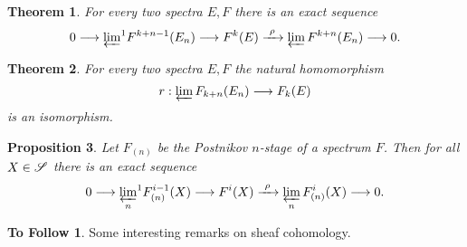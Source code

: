\documentclass[11pt]{article}
\theoremstyle{plain}
\newtheorem{thm}{Theorem}[subsection]
\newtheorem{prop}[thm]{Proposition}
\theoremstyle{definition}
\newtheorem*{ToFollow}{To Follow}
\begin{document}
{\begin{thm}
For every two spectra $E,F$ there is an exact sequence
\[0\to{\displaystyle{\varprojlim}^1}F^{k+n-1}(E_n)\to F^k(E)
\xrightarrow{\ \rho\ }\varprojlim F^{k+n}(E_n)\to0.\]
\end{thm}
\begin{thm}
For every two spectra $E,F$ the natural homomorphism
\[r:\varprojlim F_{k+n}(E_n)\to F_k(E)\]
is an isomorphism.
\end{thm}
\begin{prop}
Let $F_{(n)}$ be the Postnikov $n$-stage of a spectrum $F$. Then for all
$X\in\scrS$ there is an exact sequence
\[0\to{\varprojlim_n}^1F_{(n)}^{i-1}(X)\to F^i(X)
\xrightarrow{\ \rho\ }\varprojlim_n F_{(n)}^{i}(X)\to0.\]
\end{prop}
\begin{ToFollow}
Some interesting remarks on sheaf cohomology.
\end{ToFollow}
}   %
\end{document}

